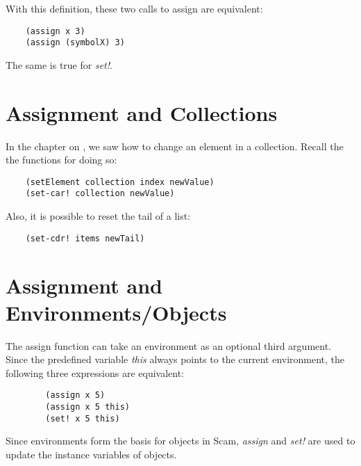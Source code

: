 With this definition, these two calls to assign are equivalent:

\begin{verbatim}
    (assign x 3)
    (assign (symbolX) 3)
\end{verbatim}

The same is true for {\it set!}.

\section{Assignment and Collections}

In the chapter on ,
we saw how to change an element in a collection. Recall the
the functions for doing so:

\begin{verbatim}
    (setElement collection index newValue)
    (set-car! collection newValue)
\end{verbatim}

Also, it is possible to reset the tail of a list:

\begin{verbatim}
    (set-cdr! items newTail)
\end{verbatim}

\section{Assignment and Environments/Objects}

The assign function can take an environment as an
optional third argument.
Since the predefined variable
{\it this} always points to the current environment,
the following
three expressions are equivalent:

\begin{verbatim}
        (assign x 5)
        (assign x 5 this)
        (set! x 5 this)
\end{verbatim}

Since environments form the basis for objects in Scam,
{\it assign} and {\it set!} are used to update the instance variables
of objects.

